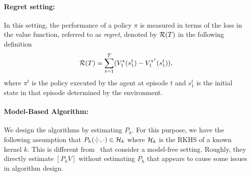 \documentclass{article}
\begin{document}
\paragraph{Regret setting:} In this setting, the performance of a policy $\pi$ is measured in terms of the loss in the value function, referred to as \emph{regret}, denoted by $\mathcal{R}(T)$ in the following definition
\begin{equation}
\mathcal{R}(T) = \sum_{t=1}^T(V^{\star}_1(s_1^t) - V^{\pi^t}_1(s_1^t)),
\end{equation}
where $\pi^t$ is the policy executed by the agent at episode $t$ and $s_1^t$ is the initial state in that episode determined by the environment. 

\paragraph{Model-Based Algorithm:} We design the algorithms by estimating $P_h$. For this purpose, we have the following assumption that $P_h(\cdot|\cdot, \cdot) \in \mathcal{H}_k$ where $\mathcal{H}_k$ is the RKHS of a known kernel $k$. This is different from~\cite{yang2020provably, vakili2024kernelized} that consider a model-free setting. Roughly, they directly estimate $[P_hV]$ without estimating $P_h$ that appears to cause some issues in algorithm design. 






\end{document}
